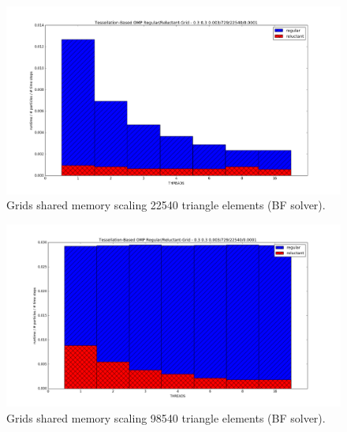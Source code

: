 \begin{figure}[htb]
  \begin{center}
    \includegraphics[width=1\textwidth]{experiments/omp/omp_mesh_regular-reluctant_20.png}
  \end{center}
  \caption{Grids shared memory scaling 22540 triangle elements (BF solver).}
  \label{figure:omp_regular_reluctant_triangle_20}
\end{figure}

\begin{figure}[htb]
  \begin{center}
    \includegraphics[width=1\textwidth]{experiments/omp/omp_mesh_regular-reluctant_200.png}
  \end{center}
  \caption{Grids shared memory scaling 98540 triangle elements (BF solver).}
  \label{figure:omp_regular_reluctant_triangle_200}
\end{figure}


